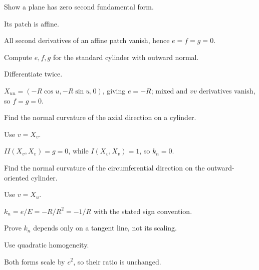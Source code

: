 \begin{exercise}\label{exr:vii15-09}
Show a plane has zero second fundamental form.
\end{exercise}
\begin{hint}
Its patch is affine.
\end{hint}
\begin{solution}
All second derivatives of an affine patch vanish, hence \(e=f=g=0\).
\end{solution}

\begin{exercise}\label{exr:vii15-10}
Compute \(e,f,g\) for the standard cylinder with outward normal.
\end{exercise}
\begin{hint}
Differentiate twice.
\end{hint}
\begin{solution}
\(X_{uu}=(-R\cos u,-R\sin u,0)\), giving \(e=-R\); mixed and \(vv\) derivatives vanish, so \(f=g=0\).
\end{solution}

\begin{exercise}\label{exr:vii15-11}
Find the normal curvature of the axial direction on a cylinder.
\end{exercise}
\begin{hint}
Use \(v=X_v\).
\end{hint}
\begin{solution}
\(II(X_v,X_v)=g=0\), while \(I(X_v,X_v)=1\), so \(k_n=0\).
\end{solution}

\begin{exercise}\label{exr:vii15-12}
Find the normal curvature of the circumferential direction on the outward-oriented cylinder.
\end{exercise}
\begin{hint}
Use \(v=X_u\).
\end{hint}
\begin{solution}
\(k_n=e/E=-R/R^2=-1/R\) with the stated sign convention.
\end{solution}

\begin{exercise}\label{exr:vii15-13}
Prove \(k_n\) depends only on a tangent line, not its scaling.
\end{exercise}
\begin{hint}
Use quadratic homogeneity.
\end{hint}
\begin{solution}
Both forms scale by \(c^2\), so their ratio is unchanged.
\end{solution}

